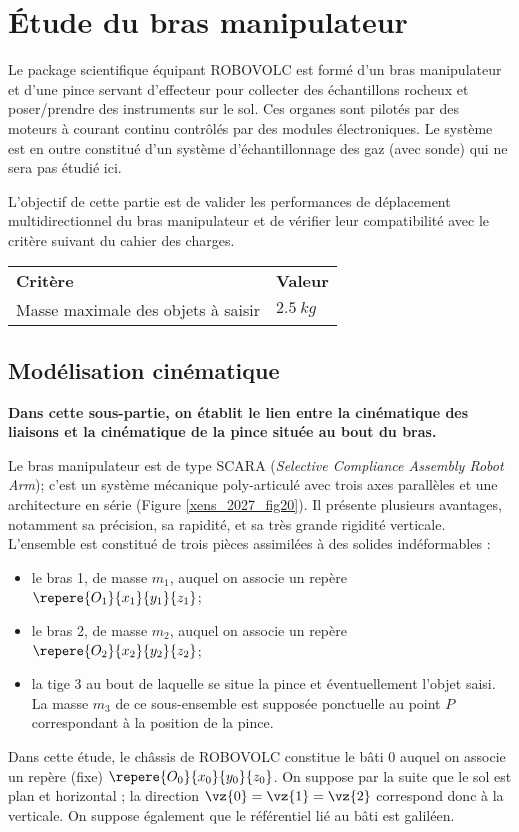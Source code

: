 \section{Étude du bras manipulateur}
\ifprof
\else
 Le package scientifique équipant ROBOVOLC est formé d'un bras manipulateur et d'une pince
 servant d'effecteur pour collecter des échantillons rocheux et poser/prendre des instruments sur le
 sol. Ces organes sont pilotés par des moteurs à courant continu contrôlés par des modules
 électroniques. Le système est en outre constitué d'un système d'échantillonnage des gaz (avec
 sonde) qui ne sera pas étudié ici. 
 
 \begin{obj}
 L'objectif de cette partie est de valider les performances de déplacement multidirectionnel
 du bras manipulateur et de vérifier leur compatibilité avec le critère suivant du cahier des
 charges.
 
 \begin{center}
 \begin{tabular}{ll}
 \textbf{Critère} & \textbf{Valeur} \\
Masse maximale des objets à saisir & $\SI{2,5}{kg}$ \\
 \end{tabular}
 \end{center}
 \end{obj}
\fi
 
 \subsection{Modélisation cinématique}
\ifprof
\else
\textbf{ Dans cette sous-partie, on établit le lien entre la cinématique des liaisons et la cinématique
 de la pince située au bout du bras. }
 
Le bras manipulateur est de type SCARA (\textit{Selective Compliance Assembly Robot Arm}); c'est un
 système mécanique poly-articulé avec trois axes parallèles et une architecture en série (Figure
 \ref{xens_2027_fig20}). Il présente plusieurs avantages, notamment sa précision, sa rapidité, et sa très grande rigidité verticale. 
L'ensemble est constitué de trois pièces assimilées à des solides indéformables :
\begin{itemize}
\item le bras 1, de masse $m_1$, auquel on associe un repère $\repere{O_1}{x_1}{y_1}{z_1}$;
\item le bras 2, de masse $m_2$, auquel on associe un repère $\repere{O_2}{x_2}{y_2}{z_2}$;
\item la tige 3 au bout de laquelle se situe la pince et éventuellement l'objet saisi. La masse $m_3$ de ce
 sous-ensemble est supposée ponctuelle au point $P$ correspondant à la position de la pince.
 \end{itemize}
 Dans cette étude, le châssis de ROBOVOLC constitue le bâti 0 auquel on associe un repère (fixe)
 $\repere{O_0}{x_0}{y_0}{z_0}$. On suppose par la suite que le sol est plan et horizontal ; la direction $\vz{0}=\vz{1}=\vz{2}$
 correspond donc à la verticale. On suppose également que le référentiel lié au bâti est galiléen.
 
